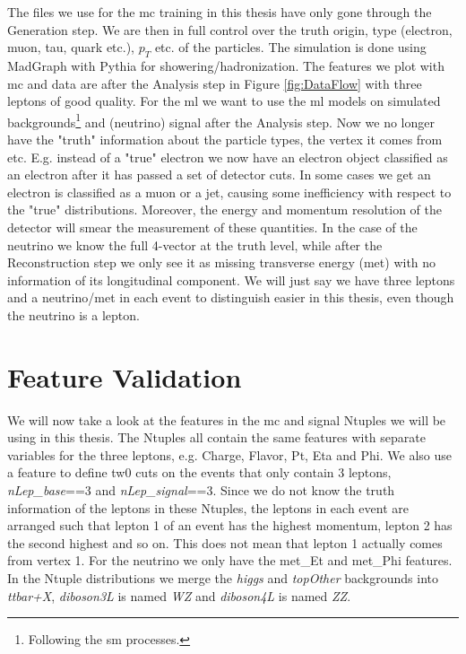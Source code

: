 \documentclass[a4paper, american, 12pt]{report}
\begin{document}
	The files we use for the \acrshort{mc} training in this thesis have only gone through the Generation step. We are then in full control over the truth origin, type (electron, muon, tau, quark etc.), $p_T$ etc. of the particles. The simulation is done using MadGraph\cite{MadGraph} with Pythia\cite{pythia} for showering/hadronization. The features we plot with \acrshort{mc} and data are after the Analysis step in Figure \ref{fig:DataFlow} with three leptons of good quality. For the \acrshort{ml} we want to use the \acrshort{ml} models on simulated backgrounds\footnote{Following the \acrshort{sm} processes.} and (neutrino) signal after the Analysis step. Now we no longer have the "truth" information about the particle types, the vertex it comes from etc. E.g. instead of a "true" electron we now have an electron object classified as an electron after it has passed a set of detector cuts. In some cases we get an electron is classified as a muon or a jet, causing some inefficiency with respect to the "true" distributions. Moreover, the energy and momentum resolution of the detector will smear the measurement of these quantities. In the case of the neutrino we know the full 4-vector at the truth level, while after the Reconstruction step we only see it as missing transverse energy (\acrshort{met}) with no information of its longitudinal component. We will just say we have three leptons and a neutrino/\acrshort{met} in each event to distinguish easier in this thesis, even though the neutrino is a lepton.


	\section{Feature Validation}
	\label{sect:Method-Features}
	We will now take a look at the features in the \acrshort{mc} and signal Ntuples we will be using in this thesis. The Ntuples all contain the same features with separate variables for the three leptons, e.g. Charge, Flavor, Pt, Eta and Phi. We also use a feature to define tw0 cuts on the events that only contain 3 leptons, \textit{nLep\_base}==3 and \textit{nLep\_signal}==3. Since we do not know the truth information of the leptons in these Ntuples, the leptons in each event are arranged such that lepton 1 of an event has the highest momentum, lepton 2 has the second highest and so on. This does not mean that lepton 1 actually comes from vertex 1. For the neutrino we only have the met\_Et and met\_Phi features. In the Ntuple distributions we merge the \textit{higgs} and \textit{topOther} backgrounds into \textit{ttbar+X}, \textit{diboson3L} is named \textit{WZ} and \textit{diboson4L} is named \textit{ZZ}.
	
\end{document}
